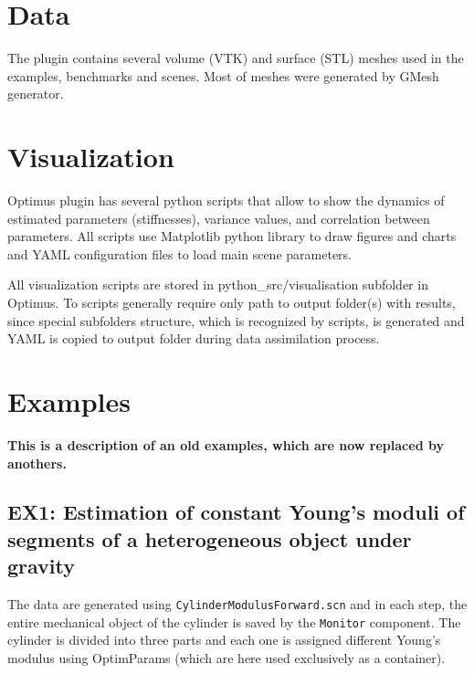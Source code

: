 \documentclass[10pt]{article}
\begin{document}
\section{Data}

The plugin contains several volume (VTK) and surface (STL) meshes used in the examples, benchmarks and scenes. Most of meshes were generated by GMesh generator.



\section{Visualization}

Optimus plugin has several python scripts that allow to show the dynamics of estimated parameters (stiffnesses), variance values, and correlation between parameters. All scripts use Matplotlib python library to draw figures and charts and YAML configuration files to load main scene parameters.

All visualization scripts are stored in python\_src/visualisation subfolder in Optimus. To scripts generally require only path to output folder(s) with results, since special subfolders structure, which is recognized by scripts, is generated and YAML is copied to output folder during data assimilation process.



\section{Examples}

{\large\bf This is a description of an old examples, which are now replaced by anothers.}

\subsection{EX1: Estimation of constant Young's moduli of segments of a heterogeneous object under gravity}

The data are generated using \texttt{CylinderModulusForward.scn} and in each step, the entire mechanical object of the cylinder is saved by the
\texttt{Monitor} component.
The cylinder is divided into three parts and each one is assigned different Young's modulus using OptimParams  (which are here used exclusively as a
container).
\end{document}
